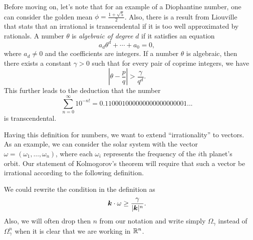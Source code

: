 \documentclass[twoside,letterpaper,11pt]{article}
\numberwithin{equation}{section}
\begin{document}
Before moving on, let's note that for an example of a Diophantine number, one
can consider the golden mean $\phi = \frac{1 + \sqrt{5}}{2}$.
Also, there is a result from Liouville that stats that an irrational is
transcendental if it is too well approximated by rationals.
A number $\theta$ is \emph{algebraic of degree $d$} if it satisfies an equation
\begin{equation*}
  a_d \theta^d + \cdots + a_0 = 0,
\end{equation*}
where $a_d \neq 0$ and the coefficients are integers.
If a number $\theta$ is algebraic, then there exists a constant $\gamma > 0$
such that for every pair of coprime integers, we have
\begin{equation*}
  \left| \theta - \frac{p}{q} \right| > \frac{\gamma}{q^d}.
\end{equation*}
This further leads to the deduction that the number
\begin{equation*}
  \sum_{n=0}^{\infty} 10^{-n!} = 0.110001000000000000000001...
\end{equation*}
is transcendental.

Having this definition for numbers, we want to extend ``irrationality'' to
vectors.
As an example, we can consider the solar system with the vector $\omega =
(\omega_1, \ldots, \omega_n)$, where each $\omega_i$ represents the frequency of
the $i$th planet's orbit.
Our statement of Kolmogorov's theorem will require that such a vector be
irrational according to the following definition.
\begin{defn}
  \label{def:diovec}
  \diovector{}
\end{defn}
We could rewrite the condition in the definition as
\begin{equation}
  \label{eq:diovec}
  \bm{k} \cdot \omega \geq \frac{\gamma}{|\bm{k}|^n}.
\end{equation}
Also, we will often drop then $n$ from our notation and write simply
$\Omega_{\gamma}$ instead of $\Omega_{\gamma}^n$ when it is clear that we are
working in $\mathbb{R}^n$.
\end{document}
